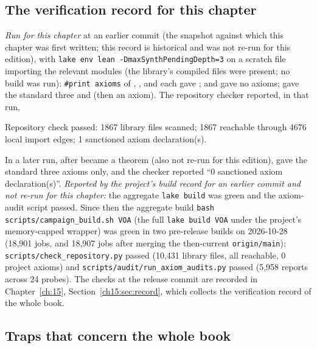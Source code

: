 \subsection{The verification record for this chapter}

\emph{Run for this chapter} at an earlier commit (the snapshot against which this chapter was
first written; this record is historical and was not re-run for this edition), with
\texttt{lake env lean -DmaxSynthPendingDepth=3} on a scratch file importing the relevant modules
(the library's compiled files were present; no build was run):
\texttt{\#print axioms} of , ,
 and  each gave
;  and  gave no
axioms;  gave the standard three and  (then an axiom). The
repository checker reported, in that run,
\begin{plaincode}
Repository check passed: 1867 library files scanned; 1867 reachable through 4676 local import edges; 1 sanctioned axiom declaration(s).
\end{plaincode}
In a later run, after  became a theorem (also not re-run for this edition),
 gave the standard three axioms only, and the checker reported
``0 sanctioned axiom declaration(s)''.
\emph{Reported by the project's build record for an earlier commit and not re-run for this chapter:}
the aggregate \texttt{lake build} was green and the axiom-audit script passed. Since then the aggregate build \texttt{bash scripts/campaign\_build.sh VOA} (the full \texttt{lake build VOA} under the project's memory-capped wrapper) was green in two pre-release builds on 2026-10-28 (18{,}901 jobs, and 18{,}907 jobs after merging the then-current \texttt{origin/main}); \texttt{scripts/check\_repository.py} passed (10{,}431 library files, all reachable, 0 project axioms) and \texttt{scripts/audit/run\_axiom\_audits.py} passed (5{,}958 reports across 24 probes). The checks at the release commit are recorded in Chapter~\ref{ch:15}, Section~\ref{ch15:sec:record}, which collects the
verification record of the whole book.

\subsection{Traps that concern the whole book}\label{ch01:sec:traps}

